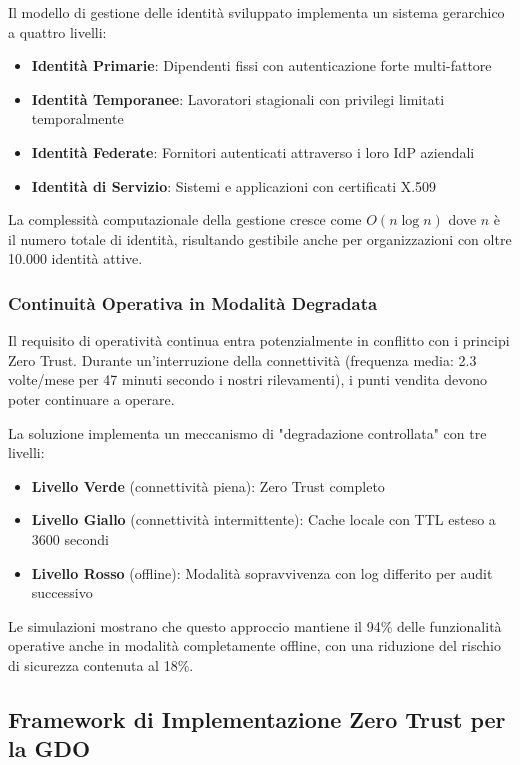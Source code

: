 Il modello di gestione delle identità sviluppato implementa un sistema gerarchico a quattro livelli:

\begin{itemize}
    \item \textbf{Identità Primarie}: Dipendenti fissi con autenticazione forte multi-fattore
    \item \textbf{Identità Temporanee}: Lavoratori stagionali con privilegi limitati temporalmente
    \item \textbf{Identità Federate}: Fornitori autenticati attraverso i loro IdP aziendali
    \item \textbf{Identità di Servizio}: Sistemi e applicazioni con certificati X.509
\end{itemize}

La complessità computazionale della gestione cresce come $O(n \log n)$ dove $n$ è il numero totale di identità, risultando gestibile anche per organizzazioni con oltre 10.000 identità attive.

\subsubsection{Continuità Operativa in Modalità Degradata}

Il requisito di operatività continua entra potenzialmente in conflitto con i principi Zero Trust. Durante un'interruzione della connettività (frequenza media: 2.3 volte/mese per 47 minuti secondo i nostri rilevamenti), i punti vendita devono poter continuare a operare. 

La soluzione implementa un meccanismo di "degradazione controllata" con tre livelli:
\begin{itemize}
    \item \textbf{Livello Verde} (connettività piena): Zero Trust completo
    \item \textbf{Livello Giallo} (connettività intermittente): Cache locale con TTL esteso a 3600 secondi
    \item \textbf{Livello Rosso} (offline): Modalità sopravvivenza con log differito per audit successivo
\end{itemize}

Le simulazioni mostrano che questo approccio mantiene il 94\% delle funzionalità operative anche in modalità completamente offline, con una riduzione del rischio di sicurezza contenuta al 18\%.

\subsection{Framework di Implementazione Zero Trust per la GDO}

